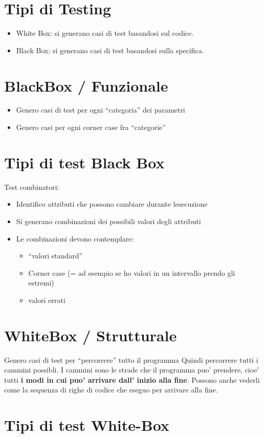 \documentclass[\main/main.tex]{subfiles}
\begin{document}
\section{Tipi di Testing}
\begin{itemize}
\item White Box: si generano casi di test basandosi sul codice.
\item Black Box: si generano casi di test basandosi sulla specifica.
\end{itemize}
\section{BlackBox / Funzionale}
\begin{itemize}
\item Genero casi di test per ogni ``categoria'' dei parametri
\item Genero casi per ogni corner case fra ``categorie''
\end{itemize}
\section{Tipi di test Black Box}
Test combinatori:
\begin{itemize}
\item Identifico attributi che possono cambiare durante lesecuzione
\item Si generano combinazioni dei possibili valori degli attributi
\item Le combinazioni devono contemplare:
\begin{itemize}
\item ``valori standard''
\item Corner case (= ad esempio se ho valori in un intervallo prendo gli estremi)
\item valori errati
\end{itemize}
\end{itemize}

\section{WhiteBox / Strutturale}
Genero casi di test per ``percorrere'' tutto il programma
Quindi percorrere tutti i cammini possibli.
I cammini sono le strade che il programma puo' prendere, cioe' tutti \textbf{i modi in cui puo' arrivare dall' inizio alla fine}.
Possono anche vederli come la sequenza di righe di codice che eseguo per arrivare alla fine.

\section{Tipi di test White-Box}
\end{document}
